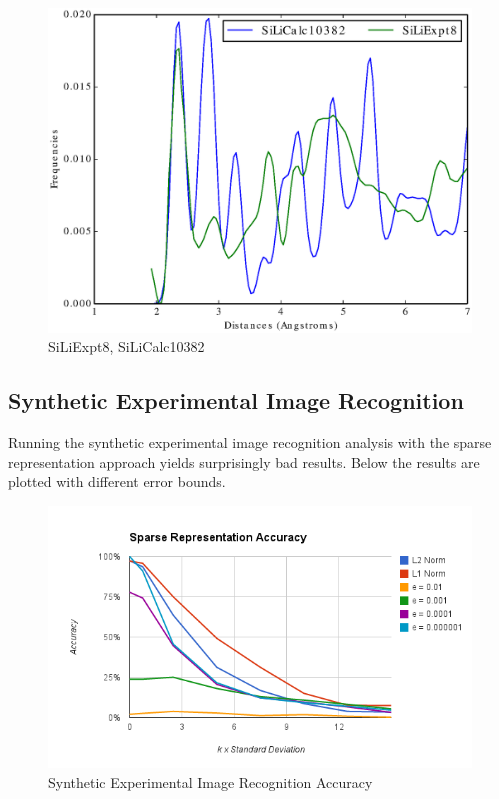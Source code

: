 \documentclass[12pt,letterpaper]{article}
\begin{document}
\begin{figure}[ht]
  \begin{center}
    \includegraphics[scale=0.8]{figs/SparseRepSiLiExpt8-SiLiCalc10382.eps}
    \caption{SiLiExpt8, SiLiCalc10382}
  \end{center}
\end{figure}
\clearpage

\subsection{Synthetic Experimental Image Recognition}
Running the synthetic experimental image recognition analysis with the sparse
representation approach yields surprisingly bad results. Below the results are
plotted with different error bounds.
\begin{figure}[ht]
  \begin{center}
    \includegraphics[scale=0.8]{figs/SparseRepSynthExprAccuracy.png}
    \caption{Synthetic Experimental Image Recognition Accuracy}
  \end{center}
\end{figure}
\clearpage
\end{document}
